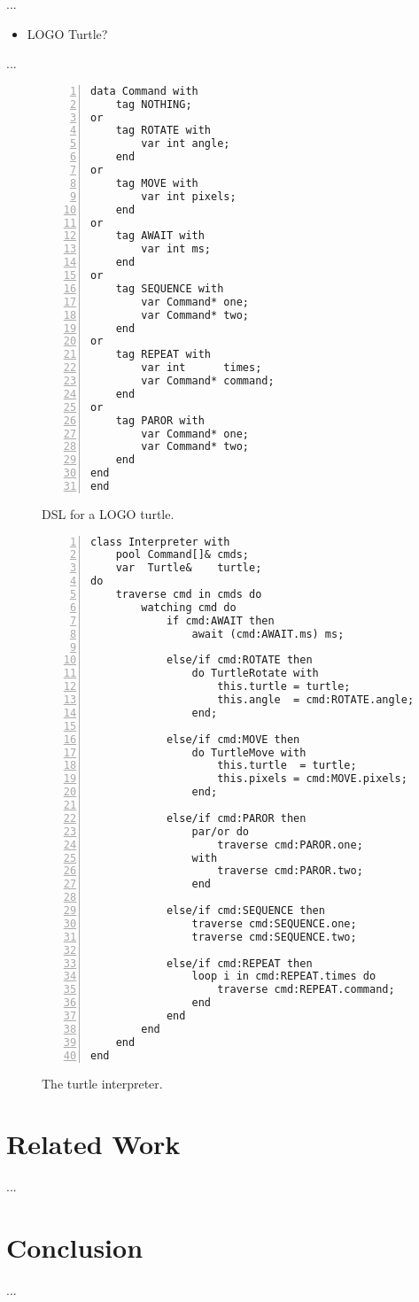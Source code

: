 \documentclass{acm_proc_article-sp}
\begin{document}
...

\begin{itemize}
\item LOGO Turtle?
\end{itemize}

...

\begin{figure}%
\begin{lstlisting}[numbers=left,xleftmargin=3em]
data Command with
    tag NOTHING;
or
    tag ROTATE with
        var int angle;
    end
or
    tag MOVE with
        var int pixels;
    end
or
    tag AWAIT with
        var int ms;
    end
or
    tag SEQUENCE with
        var Command* one;
        var Command* two;
    end
or
    tag REPEAT with
        var int      times;
        var Command* command;
    end
or
    tag PAROR with
        var Command* one;
        var Command* two;
    end
end
end
\end{lstlisting}
\caption{ DSL for a LOGO turtle.
\label{lst.turtle.dsl}
}
\end{figure}

\begin{figure}%
\begin{lstlisting}[numbers=left,xleftmargin=3em]
class Interpreter with
    pool Command[]& cmds;
    var  Turtle&    turtle;
do
    traverse cmd in cmds do
        watching cmd do
            if cmd:AWAIT then
                await (cmd:AWAIT.ms) ms;

            else/if cmd:ROTATE then
                do TurtleRotate with
                    this.turtle = turtle;
                    this.angle  = cmd:ROTATE.angle;
                end;

            else/if cmd:MOVE then
                do TurtleMove with
                    this.turtle  = turtle;
                    this.pixels = cmd:MOVE.pixels;
                end;

            else/if cmd:PAROR then
                par/or do
                    traverse cmd:PAROR.one;
                with
                    traverse cmd:PAROR.two;
                end

            else/if cmd:SEQUENCE then
                traverse cmd:SEQUENCE.one;
                traverse cmd:SEQUENCE.two;

            else/if cmd:REPEAT then
                loop i in cmd:REPEAT.times do
                    traverse cmd:REPEAT.command;
                end
            end
        end
    end
end
\end{lstlisting}
\caption{ The turtle interpreter.
\label{lst.turtle.interpreter}
}
\end{figure}

\section{Related Work}

...

\section{Conclusion}

...



\balancecolumns
\end{document}
